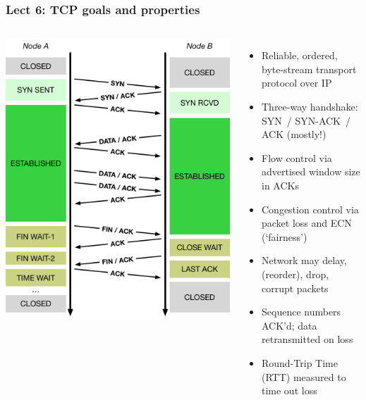 \begin{frame}
  \frametitle{Lect 6: TCP goals and properties}

  \begin{columns}[T]
      \smallskip
      \begin{center}
	\includegraphics[width=1.15\textwidth]{../../figures/tcp-timeline.pdf}
      \end{center}

      \begin{itemize}
	\item Reliable, ordered, byte-stream transport protocol over IP
	\item Three-way handshake: SYN~/ SYN-ACK~/ ACK (mostly!)
        \item Flow control via advertised window size in ACKs
	\item Congestion control via packet loss and ECN (`fairness')

	\pause

	\item Network may delay, (reorder), drop, corrupt packets
	\item Sequence numbers ACK'd; data retransmitted on loss
	\item Round-Trip Time (RTT) measured to time out loss


      \end{itemize}

  \end{columns}
\end{frame}


